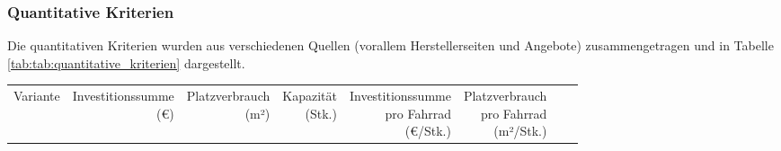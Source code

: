 \newcommand{\naun}[1]{\rotatebox{90}{\makecell[l]{#1}}}

\subsubsection{Quantitative Kriterien}

Die quantitativen Kriterien wurden aus verschiedenen Quellen (vorallem Herstellerseiten und Angebote) zusammengetragen und in Tabelle \ref{tab:tab:quantitative_kriterien} dargestellt.

\pagestyle{empty}

\begin{landscape}
  \begin{longtable}{p{}rrrrrrr}
    \toprule
    Variante                                           &
    \naun{Investitionssumme                                                                                                                                                                                                                                                                                                 \\(€)}             &
    \naun{Platzverbrauch                                                                                                                                                                                                                                                                                                    \\(m²)}               &
    \naun{Kapazität                                                                                                                                                                                                                                                                                                         \\(Stk.)}            &
    \naun{Investitionssumme                                                                                                                                                                                                                                                                                                 \\pro Fahrrad\\(€/Stk.)} &
    \naun{Platzverbrauch                                                                                                                                                                                                                                                                                                    \\pro Fahrrad\\(m²/Stk.)} &

\end{longtable}
\end{landscape}
